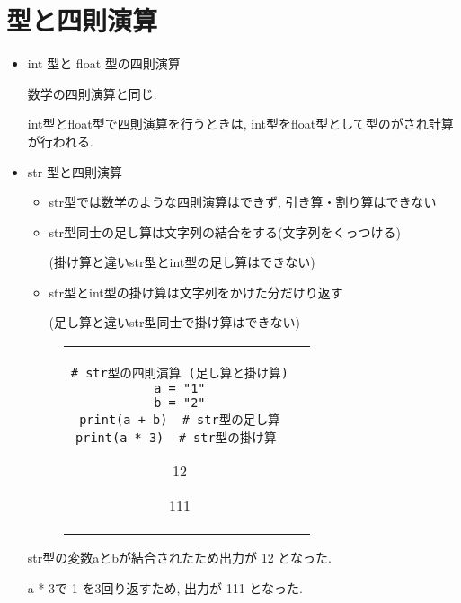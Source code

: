 \documentclass[dvipdfmx]{jsbook}
\newcommand{\info}[2]{\begin{tcolorbox}[colframe=gray, colback=black!10!white, coltitle=white, fonttitle=\bfseries, title={#1}]
{#2}\end{tcolorbox}}
\begin{document}
\section{型と四則演算}
\begin{itemize}
	\item int 型と float 型の四則演算 \par
	      数学の四則演算と同じ. \par
	      int型とfloat型で四則演算を行うときは, int型をfloat型として型のがされ計算が行われる.
	\item str 型と四則演算
	      \begin{itemize}
		      \item str型では数学のような四則演算はできず, 引き算・割り算はできない
		      \item str型同士の足し算は文字列の結合をする(文字列をくっつける) \par
		            (掛け算と違いstr型とint型の足し算はできない) \par
		      \item str型とint型の掛け算は文字列をかけた分だけり返す \par
		            (足し算と違いstr型同士で掛け算はできない)
	      \end{itemize}

	      \begin{figure}[htp]
		      \begin{tabular}{cc} \hspace{5truemm}
			      \begin{minipage}{.4\textwidth}
				      \begin{lstlisting}[caption=str型と四則演算]
# str型の四則演算 (足し算と掛け算)
a = "1"
b = "2"
print(a + b)  # str型の足し算
print(a * 3)  # str型の掛け算 \end{lstlisting}
			      \end{minipage} \hspace{5truemm}
			      \begin{minipage}{.3\textwidth}
				      \info{出力}{12 \par 111}
			      \end{minipage}
		      \end{tabular}
	      \end{figure}

	      \info{説明}{str型の変数aとbが結合されたため出力が 12 となった. \par a * 3で 1 を3回\ruby{繰}{く}り返すため, 出力が 111 となった.}
\end{itemize}
\end{document}
